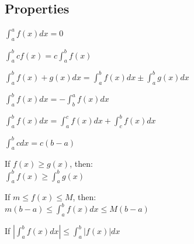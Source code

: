 \documentclass[8pt,a4paper]{extarticle}     %
\theoremstyle{definition}
\theoremstyle{definition}
\theoremstyle{definition}
\begin{document}
\begin{multicols}{4}
\begin{boxtheorem}
\end{boxtheorem}
\subsection{Properties}
\begin{eqlist}
	\item $\int_{a}^{a} f(x)dx = 0$
	\item $\int_{a}^{b} cf(x) = c\int_{a}^{b} f(x)$
	\item $\int_{a}^{b} f(x)+g(x)dx = \int_{a}^{b} f(x)dx \pm \int_{a}^{b} g(x)dx$
	\item $\int_{a}^{b} f(x)dx = -\int_{b}^{a}f(x) dx$
	\item $\int_{a}^{b} f(x)dx = \int_{a}^{c} f(x)dx + \int_{c}^{b} f(x)dx$
	\item $\int_{a}^{b} cdx = c(b-a)$
	\item If $f(x) \geq g(x)$, then: \\
	$\int_{a}^{b} f(x) \geq \int_{a}^{b} g(x)$
	\item If $m \leq f(x) \leq M$, then: \\
	$m(b-a) \leq \int_{a}^{b}f(x)dx \leq M(b-a)$
	\item If $\left|\int_{a}^{b}f(x)dx\right|\leq \int_{a}^{b}|f(x)|dx$
\end{eqlist}



\end{multicols}
\end{document}
